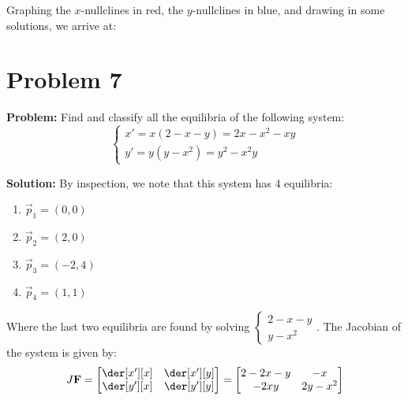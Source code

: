 \documentclass{article}
\begin{document}
Graphing the $x$-nullclines in red, the $y$-nullclines in blue, and drawing in some solutions, we arrive at:
\begin{center}
\end{center}

\section*{Problem 7}
\noindent\textbf{Problem:} Find and classify all the equilibria of the following system:
$$\begin{cases}
  x'=x(2-x-y)=2x-x^2-xy\\
  y'=y(y-x^2)=y^2-x^2y
\end{cases}$$

\noindent\textbf{Solution:} By inspection, we note that this system has 4 equilibria:
\begin{enumerate}[label=\alph*)]
  \item $\vec p_1=(0,0)$
  \item $\vec p_2=(2,0)$
  \item $\vec p_3=(-2,4)$
  \item $\vec p_4=(1,1)$
\end{enumerate}

Where the last two equilibria are found by solving $\begin{cases}
  2-x-y\\
  y-x^2
\end{cases}$. The Jacobian of the system is given by:
\begin{equation*}
  J\vec F=\begin{bmatrix}
    \der[x'][x] & \der[x'][y]\\
    \der[y'][x] & \der[y'][y]
  \end{bmatrix}=\begin{bmatrix}
    2-2x-y & -x\\
    -2xy & 2y-x^2
  \end{bmatrix}
\end{equation*}
\end{document}
